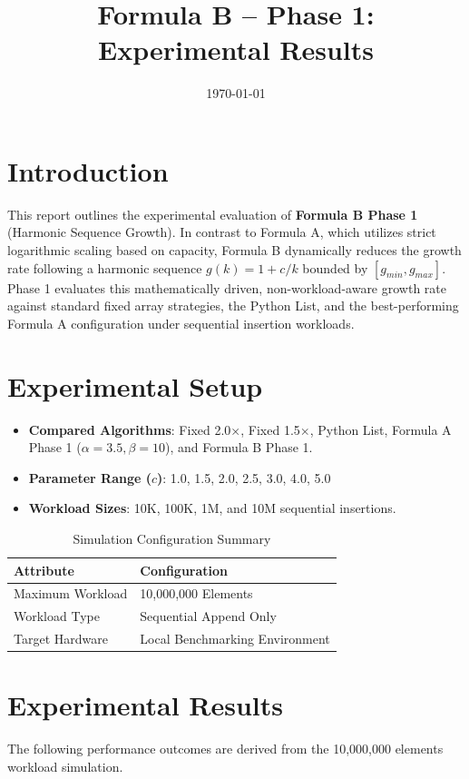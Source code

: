 \documentclass[11pt, a4paper]{article}
\title{Formula B -- Phase 1: Experimental Results}
\author{}
\date{\today}
\begin{document}
\maketitle
\tableofcontents
\listoffigures
\listoftables
\newpage

\section{Introduction}
This report outlines the experimental evaluation of \textbf{Formula B Phase 1} (Harmonic Sequence Growth). In contrast to Formula A, which utilizes strict logarithmic scaling based on capacity, Formula B dynamically reduces the growth rate following a harmonic sequence $g(k) = 1 + c/k$ bounded by $[g_{min}, g_{max}]$. Phase 1 evaluates this mathematically driven, non-workload-aware growth rate against standard fixed array strategies, the Python List, and the best-performing Formula A configuration under sequential insertion workloads.

\section{Experimental Setup}
\begin{itemize}
    \item \textbf{Compared Algorithms}: Fixed 2.0$\times$, Fixed 1.5$\times$, Python List, Formula A Phase 1 ($\alpha=3.5, \beta=10$), and Formula B Phase 1.
    \item \textbf{Parameter Range ($c$)}: 1.0, 1.5, 2.0, 2.5, 3.0, 4.0, 5.0
    \item \textbf{Workload Sizes}: 10K, 100K, 1M, and 10M sequential insertions.
\end{itemize}

\begin{table}[H]
\centering
\caption{Simulation Configuration Summary}
\begin{tabular}{@{}ll@{}}
\toprule
\textbf{Attribute} & \textbf{Configuration} \\
\midrule
Maximum Workload & 10,000,000 Elements \\
Workload Type & Sequential Append Only \\
Target Hardware & Local Benchmarking Environment \\
\bottomrule
\end{tabular}
\end{table}

\section{Experimental Results}
The following performance outcomes are derived from the 10,000,000 elements workload simulation.
\end{document}
